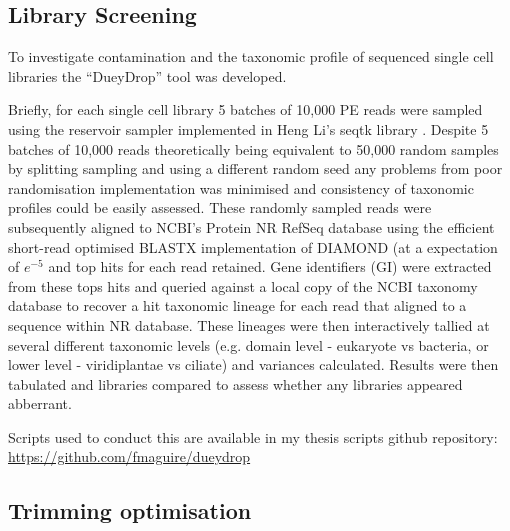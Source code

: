 \subsection{Library Screening}

To investigate contamination and the taxonomic profile of sequenced single cell libraries 
the ``DueyDrop'' tool was developed.  

Briefly, for each single cell library 5 batches of 10,000 PE reads were sampled 
using the reservoir sampler \citep{Vitter1985} implemented in Heng Li's seqtk library \citep{SeqtkGitHub}.
Despite 5 batches of 10,000 reads theoretically being equivalent to 50,000 random samples by splitting
sampling and using a different random seed any problems from poor randomisation implementation 
was minimised and consistency of taxonomic profiles could be easily assessed.
These randomly sampled reads were subsequently aligned to NCBI's Protein NR RefSeq database \citep{Pruitt2007}
using the efficient short-read optimised BLASTX implementation of DIAMOND \citep{Buchfink2015} (at a expectation
    of \(e^{-5}\) and top hits for each read retained.  Gene identifiers (GI) were extracted from these tops hits and queried against a
local copy of the NCBI taxonomy database \citep{Federhen2012} to recover a hit taxonomic lineage for each
read that aligned to a sequence within NR database. These lineages were then interactively tallied 
at several different taxonomic levels (e.g. domain level - eukaryote vs bacteria, or lower level - viridiplantae vs ciliate) and variances
calculated.  Results were then tabulated and libraries compared to assess whether any libraries appeared
abberrant.

Scripts used to conduct this are available in my thesis scripts github repository:
\url{https://github.com/fmaguire/dueydrop}

\subsection{Trimming optimisation}

